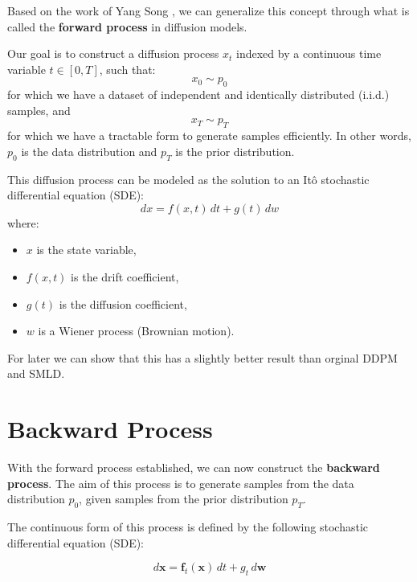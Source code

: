 Based on the work of Yang Song \cite{song_generative_2020}, we can generalize this concept through what is called the \textbf{forward process} in diffusion models.

Our goal is to construct a diffusion process \( x_{t} \) indexed by a continuous time variable \( t \in [0, T] \), such that:
\begin{equation}
    x_{0} \sim p_{0}
\end{equation}
for which we have a dataset of independent and identically distributed (i.i.d.) samples, and
\begin{equation}
    x_{T} \sim p_{T}
\end{equation}
for which we have a tractable form to generate samples efficiently. In other words, \( p_{0} \) is the data distribution and \( p_{T} \) is the prior distribution.

This diffusion process can be modeled as the solution to an Itô stochastic differential equation (SDE):
\begin{equation}
    dx = f(x, t) \, dt + g(t) \, dw
\end{equation}
where:
\begin{itemize}
    \item \( x \) is the state variable,
    \item \( f(x, t) \) is the drift coefficient,
    \item \( g(t) \) is the diffusion coefficient,
    \item \( w \) is a Wiener process (Brownian motion).
\end{itemize}

For later we can show that this has a slightly better result than orginal DDPM and SMLD.



\section{Backward Process}

With the forward process established, we can now construct the \textbf{backward process}. The aim of this process is to generate samples from the data distribution \( p_{0} \), given samples from the prior distribution \( p_{T} \).

The continuous form of this process is defined by the following stochastic differential equation (SDE):

\begin{equation}
d\mathbf{x} = \mathbf{f}_t(\mathbf{x}) \, dt + g_t \, d\mathbf{w} \label{eq:sde-forward}
\end{equation}

